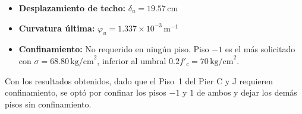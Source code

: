 \begin{itemize}
    \item \textbf{Desplazamiento de techo:} $\delta_u=19.57$\,cm
    \item \textbf{Curvatura última:} $\varphi_u=1.337\times10^{-3}$\,m$^{-1}$
    \item \textbf{Confinamiento:} No requerido en ningún piso.
          Piso $-1$ es el más solicitado con $\sigma=68.80\,\text{kg/cm}^2$,
          inferior al umbral $0.2f'_c=70\,\text{kg/cm}^2$.
\end{itemize}

Con los resultados obtenidos, dado que el Piso~1 del Pier C y J requieren confinamiento, se optó
por confinar los pisos $-1$ y $1$ de ambos y dejar los demás pisos sin confinamiento.
